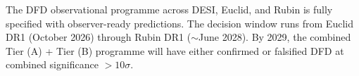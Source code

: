 \documentclass[11pt,a4paper]{article}
\begin{document}
The DFD observational programme across DESI, Euclid, and Rubin is fully
specified with observer-ready predictions. The decision window runs from
Euclid DR1 (October 2026) through Rubin DR1 ($\sim$June 2028). By 2029,
the combined Tier (A) + Tier (B) programme will have either confirmed or
falsified DFD at combined significance $> 10\sigma$.
\end{document}
